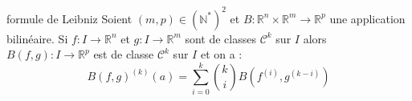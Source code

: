 \documentclass[french,11pt,twoside]{VcCours}
\begin{document}
\begin{Theoreme}{formule de Leibniz}
Soient $(m,p) \in (\mathbb{N}^*)^2$ et $B : \mathbb{R}^n \times \mathbb{R}^m \rightarrow \mathbb{R}^p$ une application bilinéaire.  Si $f : I \rightarrow \mathbb{R}^n$ et $g : I \rightarrow \mathbb{R}^m$ sont de classes $\mathcal{C}^k$ sur $I$ alors $B(f,g):  I \rightarrow \mathbb{R}^p$ est de classe $\mathcal{C}^k$ sur $I$ et on a :
$$ B(f,g)^{(k)}(a)=  \sum_{i=0}^{k} \binom{k}{i} B(f^{(i)},g^{(k-i)})$$
\end{Theoreme}
\end{document}
